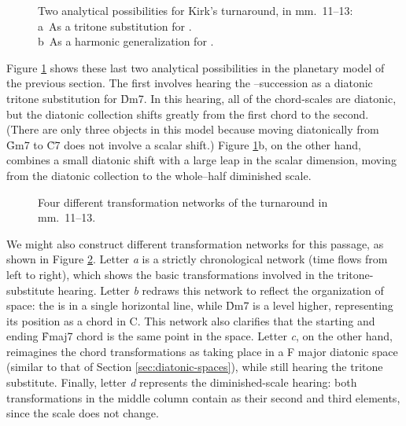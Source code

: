 \begin{figure}[tbp]
  \captionsetup{format=hang}
  \caption[Two analytical possibilities for Kirk's turnaround.]{%
    Two analytical possibilities for Kirk's turnaround, in mm.~11--13: \\
    a\rightparen\ As a tritone substitution for . \\
    b\rightparen\ As a harmonic generalization for .}
  \label{csa:turnaround-transformations}
\end{figure}

Figure \ref{csa:turnaround-transformations} shows these last two analytical
possibilities in the planetary model of the previous section. The first
involves hearing the \Eflat--\Dflat succession as a diatonic tritone
substitution for \h{Dm7}. In this hearing, all of the chord-scales
are diatonic, but the diatonic collection shifts greatly from the first chord
to the second. (There are only three objects in this model because moving
diatonically from \h{Gm7} to \h{C7} does not involve a scalar shift.) Figure
\ref{csa:turnaround-transformations}b, on the other hand, combines a small
diatonic shift with a large leap in the scalar dimension, moving from the
diatonic collection to the whole--half diminished scale.

\begin{figure}[p]
  \caption{Four different transformation networks of the turnaround in
    mm.~11--13.}
  \label{csa:turnaround-trans-networks}
\end{figure}

We might also construct different transformation networks for this passage, as
shown in Figure \ref{csa:turnaround-trans-networks}. Letter \emph{a}
is a strictly chronological network (time flows from left to right), which
shows the basic transformations involved in the tritone-substitute hearing.
Letter \emph{b} redraws this network to reflect the organization of \tf space:
the \tfo is in a single horizontal line, while \h{Dm7} is a level higher,
representing its position as a \ii chord in C. This network also clarifies that
the starting and ending \h{Fmaj7} chord is the same point in the space. Letter
\emph{c}, on the other hand, reimagines the chord transformations as taking
place in a F major diatonic space (similar to that of Section
\ref{sec:diatonic-spaces}), while still hearing the tritone substitute.
Finally, letter \emph{d} represents the diminished-scale hearing: both
transformations in the middle column contain  as their
second and third elements, since the scale does not change.

